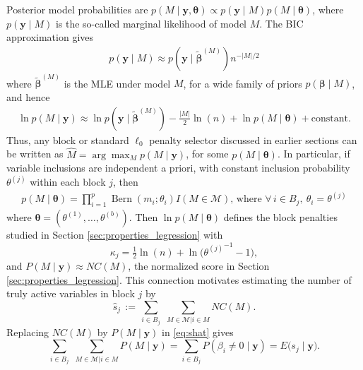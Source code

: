 \documentclass[aos]{imsart}
\theoremstyle{plain}
\newcommand{\M}{\mathcal{M}}
\newcommand{\bs}{\boldsymbol}
\begin{document}
Posterior model probabilities are $p(M \mid \bs y, \bs \theta) \propto p(\bs y \mid M) p(M \mid \bs \theta)$, where $p(\bs y \mid M)$ is the so-called marginal likelihood of model $M$. The BIC approximation \citep{BIC} gives
\begin{eqnarray*}
 p( \bs y  \mid M)\approx p(\bs y \mid \tilde{\bs \beta}^{(M)})n^{-|M|/2}
\end{eqnarray*}
where $\tilde{\bs \beta}^{(M)}$ is the MLE under model $M$,
for a wide family of priors $p(\bs \beta \mid M)$, and hence
\begin{eqnarray*}
\ln p(M \mid\bs y) \approx \ln p(\bs y \mid \tilde{\bs \beta}^{(M)}) - \frac{|M|}{2}\ln(n) + \ln p(M\mid\bs \theta) + \text{constant}.
\end{eqnarray*}
Thus, any block or standard $\ell_0$ penalty selector discussed in earlier sections can be written as $\hat{M}= \arg\max_M p(M \mid \bs y)$,
for some $p(M \mid \bs \theta)$. 
In particular, 
if variable inclusions are independent a priori,
with constant inclusion probability $\theta^{(j)}$ within each block $j$, then
\begin{eqnarray} \label{eq:block_modelprior}
p( M \mid \boldsymbol{\theta})=
        \prod_{i=1}^p \operatorname{Bern}\left(m_i ; \theta_i\right) I(M \in \M) \mbox{, where } \forall \, i\in B_j, \: \theta_i=\theta^{(j)}
\end{eqnarray}
where $\bs \theta=(\theta^{(1)},\ldots,\theta^{(b)})$.
Then $\ln p(M \mid \bs \theta)$ defines the block penalties studied in Section \ref{sec:properties_legression} with
\begin{equation}\label{eq:blockpenpriorinclu}
    \kappa_j=\tfrac{1}{2}\ln(n)+\ln\big({\theta^{(j)}}^{-1}-1\big),
\end{equation}
and $P(M \mid \bs y) \approx NC(M)$, the normalized score in Section \ref{sec:properties_legression}.
This connection motivates estimating the number of truly active variables in block $j$ by %
\begin{equation}\label{eq:shat}
    \widehat{s}_j \,:=\, \sum_{i\in B_j}\,\,\sum_{M\in \M | i \in M}NC(M).
\end{equation}
Replacing $NC(M)$ by $P(M \mid \bs y)$ in \eqref{eq:shat} gives
\begin{equation*}
    \sum_{i\in B_j}\,\,\sum_{M\in \M | i \in M}P(M\mid \bs y) = \sum_{i\in B_j}P(\beta_i \neq 0 \mid \bs y) = E\big(s_j \mid \bs y\big).
\end{equation*}
\end{document}
